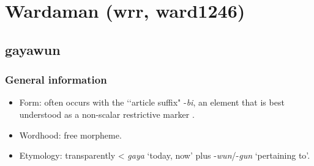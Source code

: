 \section{Wardaman (wrr, ward1246)}
\label{appendixWardaman}

\subsection{gayawun}

\subsubsection{General information}
\begin{itemize}
	\item Form: often occurs with the \lq\lq article suffix" \parencite{Merlan1994} \mbox{-\textit{bi}}, an element that is best understood as a non-scalar restrictive marker \parencite{SchultzeBerndt2002}.
	\item Wordhood: free morpheme.
	\item Etymology: transparently < \textit{gaya} \lq today, now' plus \mbox{-\textit{wun}}/\mbox{-\textit{gun}} \lq pertaining to'.
\end{itemize}


